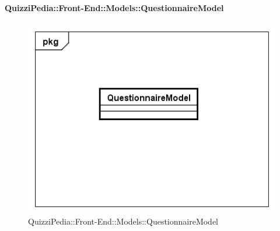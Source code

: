 		\paragraph{QuizziPedia::Front-End::Models::QuestionnaireModel}
		
		\label{QuizziPedia::Front-End::Models::QuestionnaireModel}
		
		\begin{figure}[ht]
			\centering
			\includegraphics[scale=0.5,keepaspectratio]{UML/Classi/Front-End/QuizziPedia_Front-end_Models_QuestionnaireModel.png}
			\caption{QuizziPedia::Front-End::Models::QuestionnaireModel}
		\end{figure} \FloatBarrier
		
